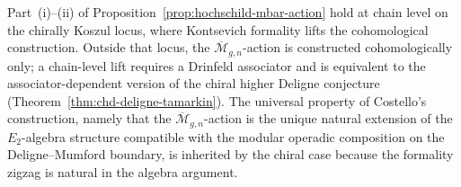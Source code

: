 \begin{remark}
\label{rem:hochschild-mbar-scope}
Part~(i)--(ii) of
Proposition~\textup{\ref{prop:hochschild-mbar-action}} hold at chain
level on the chirally Koszul locus, where Kontsevich formality lifts
the cohomological construction. Outside that locus, the
$\overline{\mathcal{M}}_{g,n}$-action is constructed cohomologically
only; a chain-level lift requires a Drinfeld associator and is
equivalent to the associator-dependent version of the chiral
higher Deligne conjecture
(Theorem~\textup{\ref{thm:chd-deligne-tamarkin}}). The universal
property of Costello's construction, namely that the
$\overline{\mathcal{M}}_{g,n}$-action is the unique natural
extension of the $E_2$-algebra structure compatible with the modular
operadic composition on the Deligne--Mumford boundary, is inherited
by the chiral case because the formality zigzag is natural in the
algebra argument.
\end{remark}

